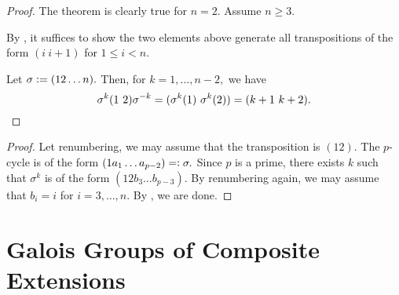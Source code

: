 \gentransposecycle*\label{thm:gentransposecycle2}
\begin{flushright}\hyperref[thm:gentransposecycle]{\upsym}\end{flushright}
\begin{proof}
    The theorem is clearly true for $n = 2.$ Assume $n \ge 3.$

    By , it suffices to show the two elements above generate all transpositions of the form $(i \ i + 1)$ for $1 \le i < n.$ 

    Let $\sigma \vcentcolon= (12 \ldots n).$ Then, for $k = 1, \ldots, n - 2,$ we have
    \begin{equation*} 
        \sigma^k(1 \ 2)\sigma^{-k} = (\sigma^k(1) \ \sigma^k(2)) = (k + 1 \ k + 2). \qedhere
    \end{equation*}
\end{proof}

\genprimetranscycle*\label{cor:genprimetranscycle2}
\begin{flushright}\hyperref[cor:genprimetranscycle]{\upsym}\end{flushright}
\begin{proof}
    Let renumbering, we may assume that the transposition is $(12).$ The $p$-cycle is of the form $(1 a_1 \ldots a_{p - 2}) =\vcentcolon \sigma.$ Since $p$ is a prime, there exists $k$ such that $\sigma^k$ is of the form $(1 2 b_3 \ldots b_{p - 3}).$ By renumbering again, we may assume that $b_i = i$ for $i = 3, \ldots, n.$ By , we are done.
\end{proof}

\section{Galois Groups of Composite Extensions}

